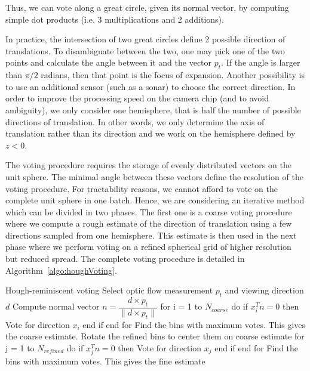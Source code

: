Thus, we can vote along a great circle, given its normal vector, by computing simple dot products (i.e. 3 multiplications and 2 additions).

In practice, the intersection of two great circles define 2 possible direction of translations. To disambiguate between the two, one may pick one of the two points and calculate the angle between it and the vector $p_t$. If the angle is larger than $\pi/2$ radians, then that point is the focus of expansion. Another possibility is to use an additional sensor (such as a sonar) to choose the correct direction. In order to improve the processing speed on the camera chip (and to avoid ambiguity), we only consider one hemisphere, that is half the number of possible directions of translation. In other words, we only determine the axis of translation rather than its direction and we work on the hemisphere defined by $z<0$.

The voting procedure requires the storage of evenly distributed vectors on the unit sphere. The minimal angle between these vectors define the resolution of the voting procedure. For tractability reasons, we cannot afford to vote on the complete unit sphere in one batch. Hence, we are considering an iterative method which can be divided in two phases. The first one is a coarse voting procedure where we compute a rough estimate of the direction of translation using a few directions sampled from one hemisphere. This estimate is then used in the next phase where we perform voting on a refined spherical grid of higher resolution but reduced spread. The complete voting procedure is detailed in Algorithm~\ref{algo:houghVoting}.

\begin{algorithm}[colback=white, label=algo:houghVoting]{Hough-reminiscent voting}
Select optic flow measurement $p_t$ and viewing direction $d$
Compute normal vector $n = \dfrac{d \times p_t}{\|d \times p_t\|}$
for i = 1 to $N_{coarse}$ do
   if $x_i^Tn = 0$ then
      Vote for direction $x_i$
   end if
end for
Find the bins with maximum votes. This gives the coarse estimate.
Rotate the refined bins to center them on coarse estimate
for j = 1 to $N_{refined}$ do
   if $x_j^Tn = 0$ then
      Vote for direction $x_j$
   end if
end for
Find the bins with maximum votes. This gives the fine estimate
\end{algorithm}

